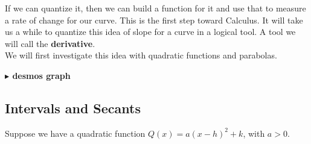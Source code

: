 \documentclass{ximera}
\begin{document}
If we can quantize it, then we can build a function for it and use that to measure a rate of change for our curve. This is the first step toward Calculus. It will take us a while to quantize this idea of slope for a curve in a logical tool. A tool we will call the \textbf{derivative}.\\

We will first investigate this idea with quadratic functions and parabolas. 








\textbf{\textcolor{blue!55!black}{$\blacktriangleright$ desmos graph}} 
\begin{center}
\end{center}

































































\subsection*{Intervals and Secants}



Suppose we have a quadratic function $Q(x) = a (x - h)^2 + k$, with $a > 0$. 
\end{document}
